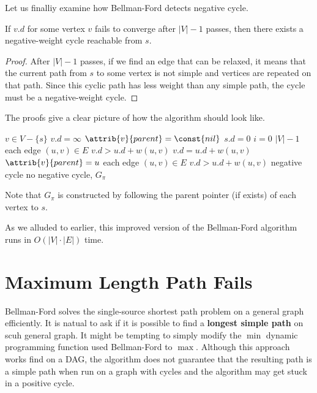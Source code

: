 Let us finalliy examine how Bellman-Ford detects negative cycle.

\begin{theorem}
    If $v.d$ for some vertex $v$ fails to converge after $|V|-1$ passes, then there exists a negative-weight cycle reachable from $s$.
\end{theorem}

\begin{proof}
    After $|V|-1$ passes, if we find an edge that can be relaxed, it means that the current path from $s$ to some vertex is not simple and vertices are repeated on that path. Since this cyclic path has less weight than any simple path, the cycle must be a negative-weight cycle.
\end{proof}

The proofs give a clear picture of how the algorithm should look like.

\begin{codebox}
    \li \For $v \in V - \{s\}$ \Do
        \li $v.d = \infty$
        \li $\attrib{v}{parent} = \const{nil}$
    \End
    \li $s.d = 0$
    \li \For $i = 0$ \To $|V|-1$ \Do
        \li \For each edge $(u,v) \in E$ \Do
            \li \If $v.d > u.d + w(u,v)$ \Then
                \li $v.d = u.d + w(u,v)$
                \li $\attrib{v}{parent} = u$
            \End
        \End
    \End
    \li \For each edge $(u,v) \in E$ \Do
        \li \If $v.d > u.d + w(u,v)$ \Then
            \li \Return negative cycle
        \End
    \End
    \li \Return no negative cycle, $G_\pi$ 
\end{codebox}
Note that $G_\pi$ is constructed by following the parent pointer (if exists) of each vertex to $s$.

As we alluded to earlier, this improved version of the Bellman-Ford algorithm runs in $O(|V|\cdot |E|)$ time.

\section{Maximum Length Path Fails}  

Bellman-Ford solves the single-source shortest path problem on a general graph efficiently. It is natual to ask if it is possible to find a \textbf{longest simple path} on scuh general graph. It might be tempting to simply modify the $\min$ dynamic programming function used Bellman-Ford to $\max$. Although this approach works find on a DAG, the algorithm does not guarantee that the resulting path is a simple path when run on a graph with cycles and the algorithm may get stuck in a positive cycle.

